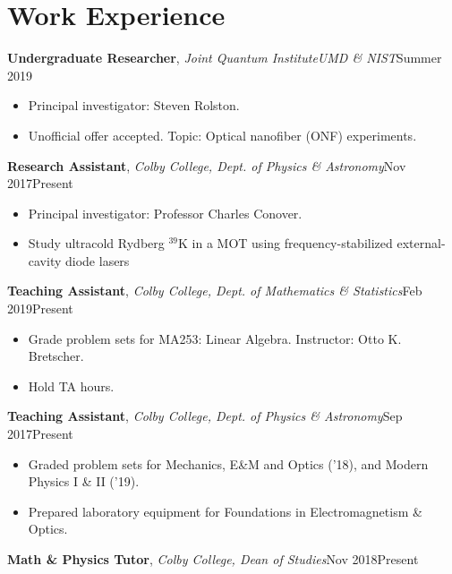 \documentclass[a4paper, 10.5pt]{article}
\begin{document}
	\section*{\normalsize{{\color{colby}\textbf{Work Experience}}}}
	\textbf{Undergraduate Researcher},  \textit{Joint Quantum Institute\textemdash UMD \&  NIST}\hfill Summer 2019
	\begin{itemize}[noitemsep, nolistsep]
		\setlength{\itemindent}{0.2in}
		\item Principal investigator: Steven Rolston.
		\item Unofficial offer accepted. Topic: Optical nanofiber (ONF) experiments. \\
	\end{itemize}
	\indent \indent \textbf{Research Assistant}, \textit{Colby College, Dept. of Physics \& Astronomy}\hfill Nov 2017\textemdash Present
	\begin{itemize}[noitemsep, nolistsep]
		\setlength{\itemindent}{0.2in}
		\item Principal investigator: Professor Charles Conover.
		\item Study ultracold Rydberg $^{\text{39}}$K in a MOT using frequency-stabilized external-cavity diode lasers\\
	\end{itemize}	
	\indent \indent \textbf{Teaching Assistant}, \textit{Colby College, Dept. of Mathematics \& Statistics}\hfill Feb 2019\textemdash Present 
	\begin{itemize}[noitemsep, nolistsep]
		\setlength{\itemindent}{0.2in}
		\item Grade problem sets for MA253: Linear Algebra. Instructor: Otto K. Bretscher.
		\item Hold TA hours. \\
	\end{itemize}
	\indent \indent \textbf{Teaching Assistant}, \textit{Colby College, Dept. of Physics \& Astronomy}\hfill Sep 2017\textemdash Present
	\begin{itemize}[noitemsep, nolistsep]
		\setlength{\itemindent}{0.2in}
		\item Graded problem sets for Mechanics, E\&M and Optics ('18), and Modern Physics I \& II ('19).
		\item Prepared laboratory equipment for Foundations in Electromagnetism \& Optics.\\
	\end{itemize}
	\indent \indent \textbf{Math \& Physics Tutor}, \textit{Colby College, Dean of Studies}\hfill Nov 2018\textemdash Present
\end{document}
